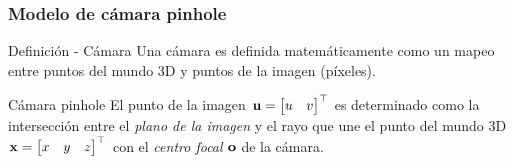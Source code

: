 \documentclass[compress]{beamer}
\begin{document}
\begin{frame}
	\frametitle{Modelo de cámara pinhole}

	\begin{block}{Definición - Cámara}
		Una cámara es definida matemáticamente como un mapeo entre puntos del mundo 3D y puntos de la imagen (píxeles).
	\end{block}

	\begin{block}{Cámara pinhole}
		El punto de la imagen $\boldsymbol{\mathbf{u}}=\begin{bmatrix}u & v\end{bmatrix}^{\top}$ es determinado como la intersección entre el \emph{plano de la imagen} y el rayo que une el punto del mundo 3D $\boldsymbol{\mathbf{x}}=\begin{bmatrix}x & y & z\end{bmatrix}^{\top}$ con el \emph{centro focal} $\boldsymbol{\mathbf{o}}$ de la cámara.
	\end{block}

	\vspace{-0.5em}
	\begin{figure}[!htb]
		\centering
		\hfill
	\end{figure}

\end{frame}
\end{document}
